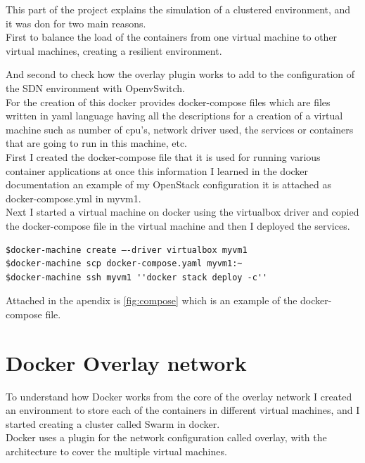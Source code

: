 This part of the project explains the simulation of a clustered environment, and it was don for two main reasons.\\

First to balance the load of the containers from one virtual machine to other virtual machines, creating a resilient environment.

And second to check how the overlay plugin works to add to the configuration of the SDN environment with OpenvSwitch.\\

For the creation of this docker provides docker-compose files which are files written in yaml language having all the descriptions for a creation of a virtual machine such as number of cpu's, network driver used, the services or containers that are going to run in this machine, etc.\\

First  I created the docker-compose file that it is used for running various container applications at once this information I learned in the docker documentation an example of my OpenStack configuration it is attached as docker-compose.yml in myvm1.\\

Next I started a virtual machine on docker using the virtualbox driver and copied the docker-compose file in the virtual machine and then I deployed the services.\\  

\begin{lstlisting}
$docker-machine create –-driver virtualbox myvm1
$docker-machine scp docker-compose.yaml myvm1:~
$docker-machine ssh myvm1 ''docker stack deploy -c''
\end{lstlisting}

Attached in the apendix is \autoref{fig:compose} which is an example of the docker-compose file.

\section{Docker Overlay network}

To understand how Docker works from the core of the overlay network I created an environment to store each of the containers in different virtual machines, and I started creating a cluster called Swarm in docker.\\

Docker uses a plugin for the network configuration called overlay, with the architecture to cover the multiple virtual machines.\\ 

